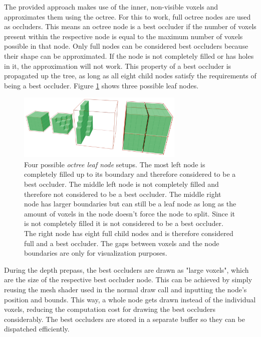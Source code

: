 \noindent
The provided approach makes use of the inner, non-visible voxels and approximates them using the octree. For this 
to work, full octree nodes are used as occluders. This means an octree node is a best occluder if the number of 
voxels present within the respective node is equal to the maximum number of voxels possible in that node. Only full 
nodes can be considered best occluders because their shape can be approximated. If the node is not completely filled 
or has holes in it, the approximation will not work. This property of a best occluder is propagated up the tree, as 
long as all eight child nodes satisfy the requirements of being a best occluder. Figure 
\ref{fig:octreenode-filled-non-filled} shows three possible leaf nodes. 

\begin{figure}[h]
    \centering
    \includegraphics[width=300px]{images/graphics/octree-nodes-filled.jpg}
    \caption{Four possible \emph{octree leaf node} setups. The most left node is completely filled up to its 
    boundary and therefore considered to be a best occluder. The middle left node is not completely filled and therefore 
    not considered to be a best occluder. The middle right node has larger boundaries but can still be a leaf node as long 
    as the amount of voxels in the node doesn't force the node to split. Since it is not completely filled it is not 
    considered to be a best occluder. The right node has eight full child nodes and is therefore considered full and a best occluder.
    The gaps between voxels and the node boundaries are only for visualization purposes.}
    \label{fig:octreenode-filled-non-filled}
\end{figure}

\noindent
During the depth prepass, the best occluders are drawn as "large voxels", which are the size of the respective 
best occluder node. This can be achieved by simply reusing the mesh shader used in the normal draw call and 
inputting the node's position and bounds. This way, a whole node gets drawn instead of the individual voxels, 
reducing the computation cost for drawing the best occluders considerably. The best occluders are stored in a 
separate buffer so they can be dispatched efficiently. \\

